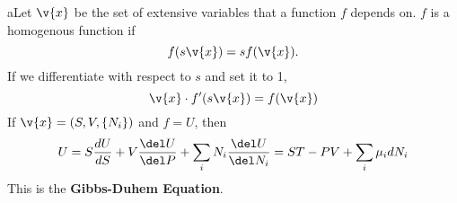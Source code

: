 
aLet $\v{x}$ be the set of extensive variables that a function $f$ depends on. $f$ is a homogenous function if 
    \begin{equation}
        f(s\v{x})=sf(\v{x}).
    \end{equation}
    If we differentiate with respect to $s$ and set it to 1,
    \begin{equation}
        \v{x}\cdot f'(s\v{x})=f(\v{x})
    \end{equation}
    If $\v{x}=(S,V,\{N_i\})$ and $f=U$, then
    \begin{equation}
        U = S \frac{d U}{d S}+V \frac{\del U}{\del P}+\sum_i N_i \frac{\del U}{\del N_i}=ST-PV+\sum_i \mu_idN_i
    \end{equation}
    This is the \textbf{Gibbs-Duhem Equation}.